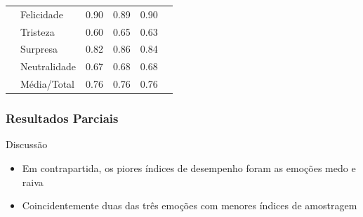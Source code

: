 \documentclass{beamer}
\begin{document}
\begin{frame}
\begin{table}[]
\begin{tabular}{llcccc}
                                    & Felicidade   & 0.90     & 0.89      & 0.90     &                                 \\
                                    & Tristeza     & 0.60     & 0.65      & 0.63     &                                 \\
                                    & Surpresa     & 0.82     & 0.86      & 0.84     &                                 \\
                                    & Neutralidade & 0.67     & 0.68      & 0.68     &                                 \\
                                    & Média/Total  & 0.76     & 0.76      & 0.76     &                                 \\ \hline
\end{tabular}
\end{table} 
\end{frame}


\begin{frame}
\frametitle{Resultados Parciais}
 \begin{block}{Discussão}
\begin{itemize}
\item Em contrapartida, os piores índices de desempenho foram as emoções medo e raiva
\pause
\item Coincidentemente duas das três emoções com menores índices de amostragem
\end{itemize}
\end{block}
\end{frame}
\end{document}

